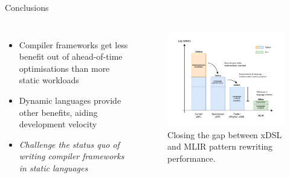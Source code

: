 \documentclass[10pt,aspectratio=169]{beamer}
\begin{document}
\begin{frame}{Conclusions}
\begin{columns}[T,onlytextwidth]
\begin{itemize}
                \itemindent=-13pt
                \item Compiler frameworks get less benefit out of ahead-of-time optimisations than more static workloads
                \item Dynamic languages provide other benefits, aiding development velocity
                \vspace{1.5em}
                \item \textit{Challenge the status quo of writing compiler frameworks in static languages}
            \end{itemize}
            \begin{figure}[H]
                \vspace{-1em}
                \includegraphics[width=\textwidth]{images/narrative.drawio.pdf}
                \vspace{-1.5em}
                \caption{Closing the gap between xDSL and MLIR pattern rewriting performance.} %
                \label{fig:narrative}
            \end{figure}
    \end{columns}
\end{frame}
\end{document}
